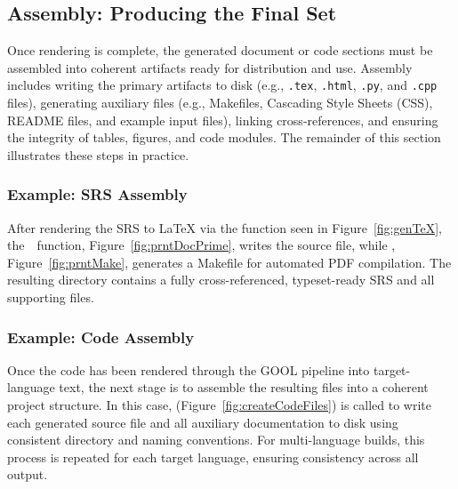 
\subsection{Assembly: Producing the Final \SF{} Set}
Once rendering is complete, the generated document or code sections must be 
assembled into coherent artifacts ready for distribution and use. Assembly 
includes writing the primary artifacts to disk (e.g., \texttt{.tex},
\texttt{.html}, \texttt{.py}, and \texttt{.cpp} files), generating auxiliary
files (e.g., Makefiles, Cascading Style Sheets (CSS), README files, and example
input files), linking cross-references, and ensuring the integrity of tables,
figures, and code modules. The remainder of this section illustrates these 
steps in practice.

\subsubsection{Example: SRS Assembly}

After rendering the \gb{} SRS to \LaTeX{} via the  function seen 
in Figure~\ref{fig:genTeX}, the~~function, 
Figure~\ref{fig:prntDocPrime}, writes the source file, while , 
Figure~\ref{fig:prntMake}, generates a Makefile for automated PDF compilation. 
The resulting directory contains a fully cross-referenced, typeset-ready SRS 
and all supporting files.



\subsubsection{Example: Code Assembly}

Once the code has been rendered through the GOOL pipeline into target-language 
text, the next stage is to assemble the resulting files into a coherent project 
structure. In this case,  
(Figure~\ref{fig:createCodeFiles}) is called to write each generated source 
file and all auxiliary documentation to disk using consistent directory and 
naming conventions. For multi-language builds, this process is repeated for 
each target language, ensuring consistency across all output.

